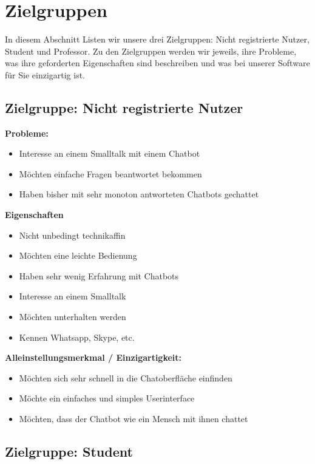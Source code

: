 \section{Zielgruppen}
In diesem Abschnitt Listen wir unsere drei Zielgruppen: Nicht registrierte Nutzer, Student und Professor.
Zu den Zielgruppen werden wir jeweils, ihre Probleme, was ihre geforderten Eigenschaften sind beschreiben und was bei unserer Software für Sie 
einzigartig ist.


\subsection{Zielgruppe: Nicht registrierte Nutzer}

\textbf{Probleme:}
\begin{itemize}
    \item Interesse an einem Smalltalk mit einem Chatbot
    \item Möchten einfache Fragen beantwortet bekommen
    \item Haben bisher mit sehr monoton antworteten Chatbots gechattet
\end{itemize}
\medskip

\textbf{Eigenschaften}
\begin{itemize}
    \item Nicht unbedingt technikaffin
    \item Möchten eine leichte Bedienung
    \item Haben sehr wenig Erfahrung mit Chatbots
    \item Interesse an einem Smalltalk
    \item Möchten unterhalten werden
    \item Kennen Whatsapp, Skype, etc.
\end{itemize}
\medskip

\textbf{Alleinstellungsmerkmal / Einzigartigkeit:}
\begin{itemize}
    \item Möchten sich sehr schnell in die Chatoberfläche einfinden
    \item Möchte ein einfaches und simples Userinterface
    \item Möchten, dass der Chatbot wie ein Mensch mit ihnen chattet
\end{itemize}

\subsection{Zielgruppe: Student}

